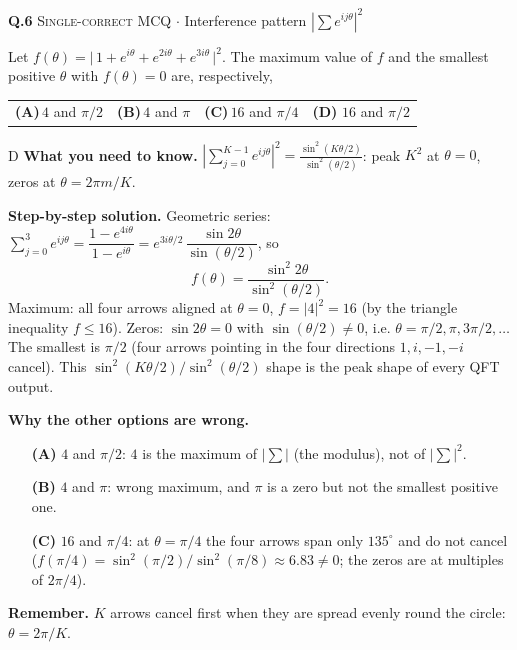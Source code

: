 \documentclass[11pt,a4paper]{article}
\newcommand{\optlabel}[1]{\textbf{(#1)}}
\newcommand{\correctlabel}[1]{\textcolor{okgreen}{\textbf{(#1)}\,\ding{51}}}
\newenvironment{qitem}[1]{\begin{list}{}{\setlength{\leftmargin}{3.3em}\setlength{\labelwidth}{3.1em}%
  \setlength{\labelsep}{0.2em}\setlength{\topsep}{3pt}\setlength{\parsep}{3pt}}\item[\textbf{Q.#1}\hfill]}{\end{list}}
\newcommand{\qsep}{\par\vspace{2pt}{\color{black!15}\hrule}\vspace{4pt}}
\newcommand{\qmeta}[2]{{\footnotesize\color{black!60}\textsc{#1} \;$\cdot$\; #2}\par}
\begin{document}
\begin{qitem}{6}
\qmeta{Single-correct MCQ}{Interference pattern $|\sum e^{ij\theta}|^2$}
Let $f(\theta) = \big|\,1 + e^{i\theta} + e^{2i\theta} + e^{3i\theta}\,\big|^2$. The maximum value of $f$ and the smallest
positive $\theta$ with $f(\theta) = 0$ are, respectively,
\par\smallskip\noindent\begin{tabularx}{\linewidth}{@{}*{4}{L}@{}}
\optlabel{A}\,$4$ and $\pi/2$ & \optlabel{B}\,$4$ and $\pi$ & \optlabel{C}\,$16$ and $\pi/4$ & \correctlabel{D}\,$16$ and $\pi/2$
\end{tabularx}
\end{qitem}
\begin{solbox}{D}
\textbf{\color{brand}What you need to know.} $|\sum_{j=0}^{K-1}e^{ij\theta}|^2 = \frac{\sin^2(K\theta/2)}{\sin^2(\theta/2)}$: peak $K^2$ at $\theta = 0$, zeros at $\theta = 2\pi m/K$.

\textbf{\color{brand}Step-by-step solution.} Geometric series: $\sum_{j=0}^{3} e^{ij\theta} = \dfrac{1 - e^{4i\theta}}{1 - e^{i\theta}}
= e^{3i\theta/2}\,\dfrac{\sin 2\theta}{\sin(\theta/2)}$, so
\[ f(\theta) = \frac{\sin^2 2\theta}{\sin^2(\theta/2)} . \]
Maximum: all four arrows aligned at $\theta = 0$, $f = |4|^2 = 16$ (by the triangle inequality $f \le 16$).
Zeros: $\sin 2\theta = 0$ with $\sin(\theta/2) \neq 0$, i.e. $\theta = \pi/2, \pi, 3\pi/2, \dots$ The smallest is $\pi/2$
(four arrows pointing in the four directions $1, i, -1, -i$ cancel). This $\sin^2(K\theta/2)/\sin^2(\theta/2)$ shape is the
peak shape of every QFT output.

\textbf{\color{brand}Why the other options are wrong.}
\begin{itemize}[leftmargin=2.4em, itemsep=1pt, topsep=2pt]
\item[\textbf{(A)}] $4$ and $\pi/2$: $4$ is the maximum of $|\sum|$ (the modulus), not of $|\sum|^2$.
\item[\textbf{(B)}] $4$ and $\pi$: wrong maximum, and $\pi$ is a zero but not the smallest positive one.
\item[\textbf{(C)}] $16$ and $\pi/4$: at $\theta = \pi/4$ the four arrows span only $135^\circ$ and do not cancel ($f(\pi/4) = \sin^2(\pi/2)/\sin^2(\pi/8) \approx 6.83 \neq 0$; the zeros are at multiples of $2\pi/4$).
\end{itemize}
\textbf{\color{brand}Remember.} $K$ arrows cancel first when they are spread evenly round the circle: $\theta = 2\pi/K$.
\end{solbox}
\qsep
\end{document}
